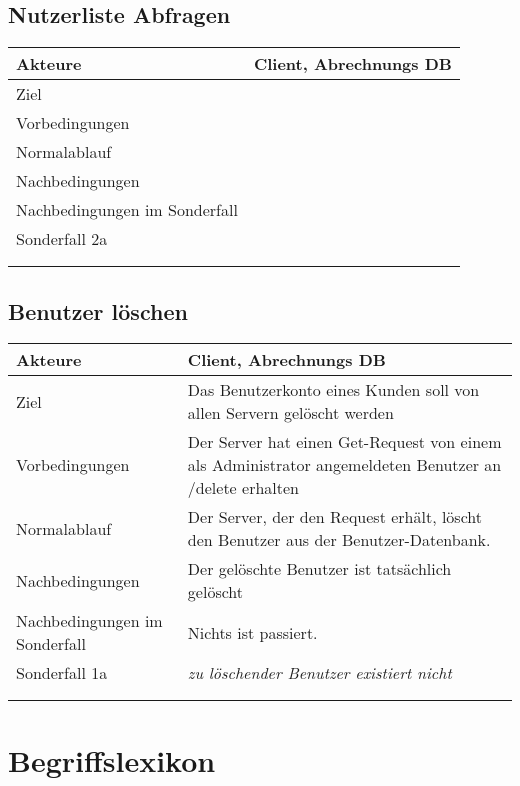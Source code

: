 \documentclass[a4paper,10pt,titlepage]{article}
\makeatletter
\newcommand\novspace{\@minipagetrue}
\newenvironment{owncompactitem}{%
\compactitem
}{%
\@finalstrut\@arstrutbox
\@nameuse{endcompactitem}%
\aftergroup\let\aftergroup\@finalstrut\aftergroup\@gobble
}
\newenvironment{owncompactenum}{%
\compactenum
}{%
\@finalstrut\@arstrutbox
\@nameuse{endcompactenum}%
\aftergroup\let\aftergroup\@finalstrut\aftergroup\@gobble
}
\newcommand{\usecase}[7]
{\subsection{#1}
\setlength{\extrarowheight}{2pt}
\begin{tabular}{|p{0.2\textwidth}|p{0.9\textwidth}|}
\hline
  Akteure & #2\\\hline
  Ziel & #3\\\hline
  Vorbedingungen & \novspace
  	\begin{owncompactitem}[-] #4 \end{owncompactitem} \\\hline
  Normalablauf & \vspace{-7pt}
  	\begin{owncompactenum}[1.] #6 \end{owncompactenum} \\\hline
  Nachbedingungen & \novspace
  	\begin{owncompactitem}[-] #5 \end{owncompactitem} \\\hline
  #7
\end{tabular}
}
\newcommand{\sonderfall}[4][\empty]
{
Sonderfall #2 & \vspace{-10pt}
	\textit{#3}
	\begin{owncompactenum}[{#2}.1] {#4} \end{owncompactenum}
  	\ifthenelse{\equal{#1}{\empty}}
    	{\\\hline} %
    	{\ensuremath{\rightarrow} #1 \\ [+1pt] \hline} %

}
\newcommand{\sondernachbedingung}[1]
{
Nachbedingungen im Sonderfall& \novspace
	\begin{owncompactitem}[-]
		#1
	\end{owncompactitem} \\\hline
}
\newcommand{\begriff}[7]
{\subsection{#1}
\begin{tabular}{|p{0.2\textwidth}|p{0.7\textwidth}|}
\hline
  Bedeutung & #2\\\hline
  Abgrenzung & #3\\\hline
  Gültigkeit & #4\\\hline
  Bezeichnung & #5\\\hline
  Unklarheiten & #6\\\hline
  Querverweise & #7\\\hline
 \end{tabular}}
\makeatother
\begin{document}
\usecase{Nutzerliste Abfragen}{Client, Abrechnungs DB}%
{}%
{%
  \item
}
{%
  \item
}
{%
  \item
}
{%
  \sondernachbedingung{
	\item
	}
  \sonderfall[Panic]{2a}%
	  {}%
	  {
	  \item .
	  }
}



\usecase{Benutzer löschen}{Client, Abrechnungs DB}%
{Das Benutzerkonto eines Kunden soll von allen Servern gelöscht werden}%
{%
  \item Der Server hat einen Get-Request von einem als Administrator angemeldeten Benutzer an /delete erhalten
}
{%
  \item Der gelöschte Benutzer ist tatsächlich gelöscht
}
{%
  \item Der Server, der den Request erhält, löscht den Benutzer aus der Benutzer-Datenbank.
}
{%
  \sondernachbedingung{
	\item Nichts ist passiert.
	}
  \sonderfall[Weiter mit normalem Betrieb]{1a}%
	  {zu löschender Benutzer existiert nicht}%
	  {
	  \item Der Server schickt eine entsprechende Fehlermeldung an den Client, der die Lösch-Anfrage verursacht hat
	  }
}
\clearpage
\appendix
\section{Begriffslexikon}

\end{document}
